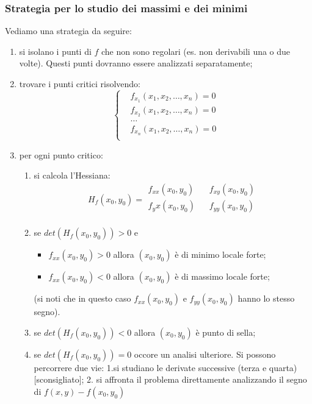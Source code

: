\subsubsection{Strategia per lo studio dei massimi e dei minimi}
Vediamo una strategia da seguire:
\begin{enumerate}
    \item si isolano i punti di $f$ che non sono regolari (es. non derivabili una o due volte). Questi punti dovranno essere analizzati separatamente;
    \item trovare i punti critici risolvendo:
        \[
            \begin{cases}
                &f_{x_1}(x_1,x_2,\dots,x_n) = 0\\
                &f_{x_2}(x_1,x_2,\dots,x_n) = 0\\
                &\dots\\
                &f_{x_n}(x_1,x_2,\dots,x_n) = 0\\
            \end{cases}
        \]
    \item per ogni punto critico:
        \begin{enumerate}
            \item si calcola l'Hessiana:
                \[
                    H_f(x_0, y_0) = \begin{matrix}
                        f_{xx}(x_0,y_0) \;\;\; & f_{xy}(x_0,y_0)\\
                        f_yx(x_0,y_0) \;\;\; & f_{yy}(x_0,y_0)\\
                    \end{matrix}
                \]
            \item se $det(H_f(x_0, y_0)) > 0$ e
                \begin{itemize}
                    \item $f_{xx}(x_0,y_0)>0$ allora $(x_0, y_0)$ è di minimo locale forte;
                    \item $f_{xx}(x_0,y_0)<0$ allora $(x_0, y_0)$ è di massimo locale forte;
                \end{itemize}
                (si noti che in questo caso $f_{xx}(x_0,y_0)$ e $f_{yy}(x_0,y_0)$ hanno lo stesso segno).
            \item se $det(H_f(x_0, y_0)) < 0$ allora $(x_0, y_0)$ è punto di sella;
            \item se $det(H_f(x_0, y_0)) = 0$ occore un analisi ulteriore. Si possono percorrere due vie: 1.si studiano le derivate successive (terza e quarta) [sconsigliato]; 2. si affronta il problema direttamente analizzando il segno di $f(x,y) - f(x_0, y_0)$
        \end{enumerate}
\end{enumerate}
